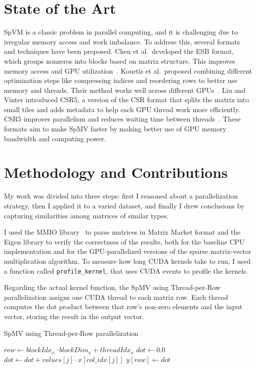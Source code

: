 \documentclass[conference]{IEEEtran}
\begin{document}
\section{State of the Art}

SpVM is a classic problem in parallel computing, and it is challenging due to irregular memory access and work imbalance. To address this, several formats and techniques have been proposed. Chen et al.\ developed the ESB format, which groups nonzeros into blocks based on matrix structure. This improves memory access and GPU utilization~\cite{chen2017esb}. Kourtis et al.\ proposed combining different optimization steps like compressing indices and reordering rows to better use memory and threads. Their method works well across different GPUs~\cite{kourtis2016optimizing}. Liu and Vinter introduced CSR5, a version of the CSR format that splits the matrix into small tiles and adds metadata to help each GPU thread work more efficiently. CSR5 improves parallelism and reduces waiting time between threads~\cite{liu2015csr5}. These formats aim to make SpMV faster by making better use of GPU memory bandwidth and computing power.

\section{Methodology and Contributions}\label{sec:methodology}

My work was divided into three steps: first I reasoned about a parallelization strategy, then I applied it to a varied dataset, and finally I drew conclusions by capturing similarities among matrices of similar types.

I used the MMIO library~\cite{matrixmarketmmio} to parse matrices in Matrix Market format and the Eigen library to verify the correctness of the results, both for the baseline CPU implementation and for the GPU-parallelized versions of the sparse matrix-vector multiplication algorithm. To measure how long CUDA kernels take to run, I used a function called \texttt{profile\_kernel}, that uses CUDA events to profile the kernels.

Regarding the actual kernel function, the SpMV using Thread-per-Row parallelization assigns one CUDA thread to each matrix row. Each thread computes the dot product between that row's non-zero elements and the input vector, storing the result in the output vector.
\begin{algorithm}[ht]
    \caption{SpMV using Thread-per-Row parallelization}
    \begin{algorithmic}[1]
        \State $row \gets blockIdx_x \cdot blockDim_x + threadIdx_x$
            \State $dot \gets 0.0$
                \State $dot \gets dot + values[j] \cdot x[col\_idx[j]]$
            \EndFor
            \State $y[row] \gets dot$
        \EndIf
    \EndProcedure
    \end{algorithmic}
\end{algorithm}
\end{document}
